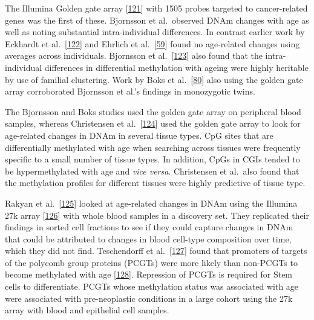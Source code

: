 \documentclass[
]{book}
\begin{document}
The Illumina Golden gate array {[}\protect\hyperlink{ref-Bibikova2006}{121}{]} with 1505 probes targeted to cancer-related genes was the first of these.
Bjornsson et al.~observed DNAm changes with age as well as noting substantial intra-individual differences.
In contrast earlier work by Eckhardt et al.~{[}\protect\hyperlink{ref-Eckhardt2006}{122}{]} and Ehrlich et al.~{[}\protect\hyperlink{ref-Ehrlich1982}{59}{]} found no age-related changes using averages across individuals.
Bjornsson et al.~{[}\protect\hyperlink{ref-Bjornsson2008}{123}{]} also found that the intra-individual differences in differential methylation with ageing were highly heritable by use of familial clustering.
Work by Boks et al.~{[}\protect\hyperlink{ref-Boks2009}{80}{]} also using the golden gate array corroborated Bjornsson et al.'s findings in monozygotic twins.

The Bjornsson and Boks studies used the golden gate array on peripheral blood samples, whereas Christensen et al.~{[}\protect\hyperlink{ref-Christensen2009}{124}{]} used the golden gate array to look for age-related changes in DNAm in several tissue types.
CpG sites that are differentially methylated with age when searching across tissues were frequently specific to a small number of tissue types.
In addition, CpGs in CGIs tended to be hypermethylated with age and \emph{vice versa}.
Christensen et al.~also found that the methylation profiles for different tissues were highly predictive of tissue type.

Rakyan et al.~{[}\protect\hyperlink{ref-Rakyan2010}{125}{]} looked at age-related changes in DNAm using the Illumina 27k array {[}\protect\hyperlink{ref-Bibikova2009}{126}{]} with whole blood samples in a discovery set.
They replicated their findings in sorted cell fractions to see if they could capture changes in DNAm that could be attributed to changes in blood cell-type composition over time, which they did not find.
Teschendorff et al.~{[}\protect\hyperlink{ref-Teschendorff2010}{127}{]} found that promoters of targets of the polycomb group proteins (PCGTs) were more likely than non-PCGTs to become methylated with age {[}\protect\hyperlink{ref-Jung2015}{128}{]}.
Repression of PCGTs is required for Stem cells to differentiate.
PCGTs whose methylation status was associated with age were associated with pre-neoplastic conditions in a large cohort using the 27k array with blood and epithelial cell samples.
\end{document}
